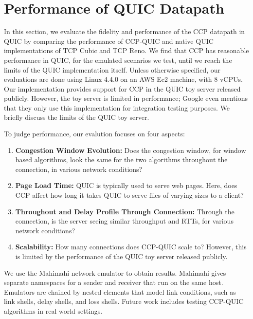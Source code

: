 \chapter{Performance of QUIC Datapath}
In this section, we evaluate the fidelity and performance of the CCP datapath in QUIC by comparing the performance of CCP-QUIC and native QUIC implementations of TCP Cubic and TCP Reno.
We find that CCP has reasonable performance in QUIC, for the emulated scenarios we test, until we reach the limits of the QUIC implementation itself.
Unless otherwise specified, our evaluations are done using Linux 4.4.0 on an AWS Ec2 machine, with 8 vCPUs.
Our implementation provides support for CCP in the QUIC toy server released publicly.
However, the toy server is limited in performance; Google even mentions that they only use this implementation for integration testing purposes.
We briefly discuss the limits of the QUIC toy server.

To judge performance, our evalution focuses on four aspects:
    \begin{enumerate}
        \item{\textbf{Congestion Window Evolution:} Does the congestion window, for window based algorithms, look the same for the two algorithms throughout the connection, in various network conditions?}
        \item{\textbf{Page Load Time:} QUIC is typically used to serve web pages. Here, does CCP affect how long it takes QUIC to serve files of varying sizes to a client?}
        \item{\textbf{Throughout and Delay Profile Through Connection:} Through the connection, is the server seeing similar throughput and RTTs, for various network conditions?}
        \item{\textbf{Scalability:} How many connections does CCP-QUIC scale to? However, this is limited by the performance of the QUIC toy server released publicly.}
    \end{enumerate}

We use the Mahimahi network emulator to obtain results. Mahimahi gives separate namespaces for a sender and receiver that run on the same host. Emulators are chained by nested elements that model link conditions, such as link shells, delay shells, and loss shells.
Future work includes testing CCP-QUIC algorithms in real world settings.
